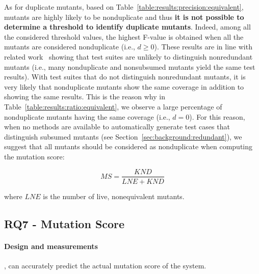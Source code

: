 As for duplicate mutants, based on Table~\ref{table:results:precision:equivalent}, 
mutants are highly likely to be nonduplicate and thus \textbf{it is not possible to determine a threshold to identify duplicate mutants}. Indeed, among all the considered threshold values, the highest F-value is obtained when all the mutants are considered nonduplicate (i.e., $d\ge0$). These results are in line with related work~\cite{shin2017theoretical} showing that test suites are unlikely to distinguish nonredundant mutants (i.e., many nonduplicate and nonsubsumed mutants yield the same test results). 
With test suites that do not distinguish nonredundant mutants, it is very likely that nonduplicate mutants show the same coverage in addition to showing the same results. This is the reason why in Table~\ref{table:results:ratio:equivalent}, we observe a large percentage of nonduplicate mutants having the same coverage (i.e., $d=0$). For this reason, when no methods are available to automatically generate test cases that distinguish subsumed mutants (see Section~\ref{sec:background:redundant}), we suggest that all mutants should be considered as nonduplicate when computing the mutation score:

\begin{equation}
\label{equation:ms:exp}
\mathit{MS} = \frac{\mathit{KND}}{\mathit{LNE}+\mathit{KND}}
\end{equation}

where $\mathit{LNE}$ is the number of live, nonequivalent mutants.




\subsection{RQ7 - \APPR Mutation Score}

\paragraph{Design and measurements}

,
can accurately predict
the actual mutation score of the system.

